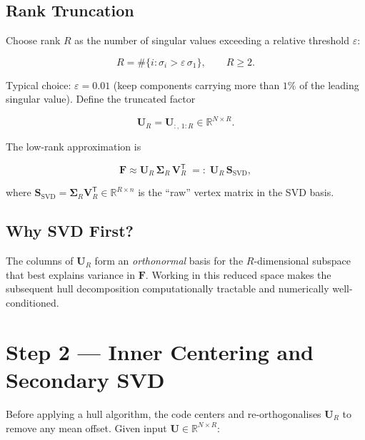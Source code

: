 \documentclass[11pt]{article}
\theoremstyle{definition}
\theoremstyle{plain}
\newcommand{\R}{\mathbb{R}}
\newcommand{\mat}[1]{\mathbf{#1}}
\newcommand{\T}{\mathsf{T}}
\begin{document}
\subsection{Rank Truncation}

Choose rank $R$ as the number of singular values exceeding a relative
threshold $\varepsilon$:

\begin{equation}
  R = \#\bigl\{ i : \sigma_i > \varepsilon\,\sigma_1 \bigr\},
  \qquad R \ge 2.
  \label{eq:rank_choice}
\end{equation}

Typical choice: $\varepsilon = 0.01$ (keep components carrying more than
$1\%$ of the leading singular value).  Define the truncated factor

\begin{equation}
  \mat{U}_R = \mat{U}_{:,\,1:R} \in \R^{N \times R}.
  \label{eq:Ur}
\end{equation}

The low-rank approximation is

\begin{equation}
  \mat{F} \approx \mat{U}_R\,\bm{\Sigma}_R\,\mat{V}_R^\T
  \;=:\; \mat{U}_R\,\mat{S}_{\mathrm{SVD}},
  \label{eq:low_rank}
\end{equation}

where $\mat{S}_{\mathrm{SVD}} = \bm{\Sigma}_R \mat{V}_R^\T \in \R^{R \times n}$
is the ``raw'' vertex matrix in the SVD basis.

\subsection{Why SVD First?}

The columns of $\mat{U}_R$ form an \emph{orthonormal} basis for the
$R$-dimensional subspace that best explains variance in $\mat{F}$.
Working in this reduced space makes the subsequent hull decomposition
computationally tractable and numerically well-conditioned.


\section{Step 2 --- Inner Centering and Secondary SVD}
\label{sec:decomp}

Before applying a hull algorithm, the code centers and re-orthogonalises
$\mat{U}_R$ to remove any mean offset.  Given input $\mat{U} \in \R^{N \times R}$:
\end{document}
